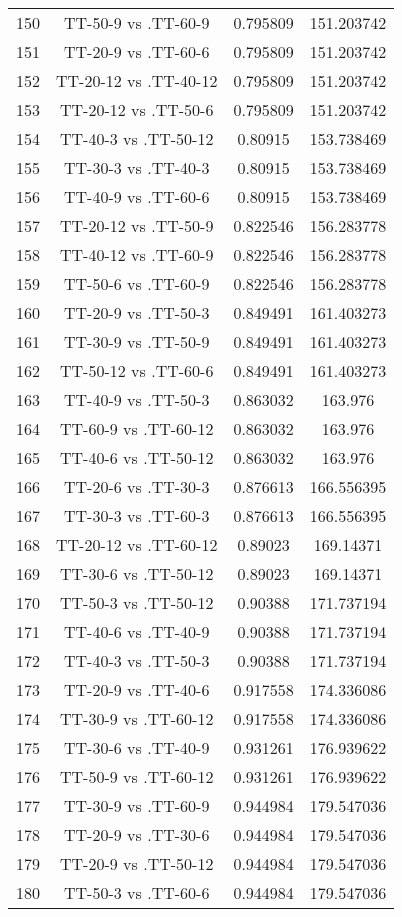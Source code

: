 \documentclass[a4paper,10pt]{article}
\begin{document}
\begin{landscape}
\begin{table}[!htp]
\begin{tabular}{cccc}
150&TT-50-9 vs .TT-60-9&0.795809&151.203742\\
151&TT-20-9 vs .TT-60-6&0.795809&151.203742\\
152&TT-20-12 vs .TT-40-12&0.795809&151.203742\\
153&TT-20-12 vs .TT-50-6&0.795809&151.203742\\
154&TT-40-3 vs .TT-50-12&0.80915&153.738469\\
155&TT-30-3 vs .TT-40-3&0.80915&153.738469\\
156&TT-40-9 vs .TT-60-6&0.80915&153.738469\\
157&TT-20-12 vs .TT-50-9&0.822546&156.283778\\
158&TT-40-12 vs .TT-60-9&0.822546&156.283778\\
159&TT-50-6 vs .TT-60-9&0.822546&156.283778\\
160&TT-20-9 vs .TT-50-3&0.849491&161.403273\\
161&TT-30-9 vs .TT-50-9&0.849491&161.403273\\
162&TT-50-12 vs .TT-60-6&0.849491&161.403273\\
163&TT-40-9 vs .TT-50-3&0.863032&163.976\\
164&TT-60-9 vs .TT-60-12&0.863032&163.976\\
165&TT-40-6 vs .TT-50-12&0.863032&163.976\\
166&TT-20-6 vs .TT-30-3&0.876613&166.556395\\
167&TT-30-3 vs .TT-60-3&0.876613&166.556395\\
168&TT-20-12 vs .TT-60-12&0.89023&169.14371\\
169&TT-30-6 vs .TT-50-12&0.89023&169.14371\\
170&TT-50-3 vs .TT-50-12&0.90388&171.737194\\
171&TT-40-6 vs .TT-40-9&0.90388&171.737194\\
172&TT-40-3 vs .TT-50-3&0.90388&171.737194\\
173&TT-20-9 vs .TT-40-6&0.917558&174.336086\\
174&TT-30-9 vs .TT-60-12&0.917558&174.336086\\
175&TT-30-6 vs .TT-40-9&0.931261&176.939622\\
176&TT-50-9 vs .TT-60-12&0.931261&176.939622\\
177&TT-30-9 vs .TT-60-9&0.944984&179.547036\\
178&TT-20-9 vs .TT-30-6&0.944984&179.547036\\
179&TT-20-9 vs .TT-50-12&0.944984&179.547036\\
180&TT-50-3 vs .TT-60-6&0.944984&179.547036\\

\end{tabular}
\end{table}
\end{landscape}
\end{document}
